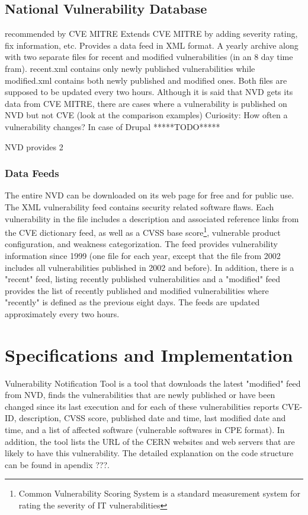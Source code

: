\subsection{National Vulnerability Database}

	recommended by CVE MITRE
    Extends CVE MITRE by adding severity rating, fix information, etc.
    Provides a data feed in XML format. A yearly archive along with two separate files for recent and modified vulnerabilities (in an 8 day time fram). recent.xml contains only newly published vulnerabilities while modified.xml contains both newly published and modified ones. Both files are supposed to be updated every two hours.
    Although it is said that NVD gets its data from CVE MITRE, there are cases where a vulnerability is published on NVD but not CVE (look at the comparison examples)
    Curiosity: How often a vulnerability changes? In case of Drupal *****TODO***** 
    
NVD provides 2 
\subsubsection{Data Feeds}
The entire NVD can be downloaded on its web page for free and for public use. The XML vulnerability feed contains security related software flaws. Each vulnerability in the file includes a description and associated reference links from the CVE dictionary feed, as well as a CVSS base score\footnote{Common Vulnerability Scoring System is a standard measurement system for rating the severity of IT vulnerabilities}, vulnerable product configuration, and weakness categorization. The feed provides vulnerability information since 1999 (one file for each year, except that the file from 2002 includes all vulnerabilities published in 2002 and before). In addition, there is a "recent" feed, listing recently published vulnerabilities and a "modified" feed provides the list of recently published and modified vulnerabilities where "recently" is defined as the previous eight days. The feeds are updated approximately every two hours.

\section{Specifications and Implementation}
Vulnerability Notification Tool is a tool that downloads the latest "modified" feed from NVD, finds the vulnerabilities that are newly published or have been changed since its last execution and for each of these vulnerabilities reports CVE-ID, description, CVSS score, published date and time, last modified date and time, and a list of affected software (vulnerable softwares in CPE format). In addition, the tool lists the URL of the CERN websites and web servers that are likely to have this vulnerability. The detailed explanation on the code structure can be found in apendix ???. 
